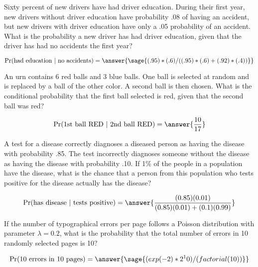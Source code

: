 \documentclass{ximera}
\begin{document}
\begin{problem}
Sixty percent of new drivers have had driver education. During their first year, new drivers without driver education have probability .08 of having an accident, but new drivers with driver education have only a .05 probability of an accident. What is the probability a new driver has had driver education, given that the driver has had no accidents the first year? 

\begin{prompt}
$$\Pr(\text{had education }|\text{ no accidents})=\answer{\sage{(.95)*(.6)/((.95)*(.6)+(.92)*(.4))}}$$
\end{prompt}
\end{problem}


\begin{problem}
An urn contains 6 red balls and 3 blue balls. One ball is selected at random and is replaced by a ball of the other color. A second ball is then chosen. What is the conditional probability that the first ball selected is red, given that the second ball was red? 

\begin{prompt}
$$\Pr(\text{1st ball RED }|\text{ 2nd ball RED})=\answer{\frac{10}{17}}$$

\end{prompt}
\end{problem}



\begin{problem}
 A test for a disease correctly diagnoses a diseased person as having the disease with probability .85. The test incorrectly diagnoses someone without the disease as having the disease with probability .10. If 1\% of the people in a population have the disease, what is the chance that a person from this population who tests positive for the disease actually has the disease? 

\begin{prompt}
$$\Pr(\text{has disease }|\text{ tests positive})=\answer{ \frac{(0.85)(0.01)}{(0.85)(0.01)+(0.1)(0.99)}}$$
\end{prompt}
\end{problem}


\begin{problem}

If the number of typographical errors per page follows a Poisson distribution with parameter $\lambda=0.2$, what is the probability that the total number of errors in 10 randomly selected pages is 10? 

\begin{prompt}
$$\Pr(\text{10 errors in 10 pages})= \answer{\sage{(exp(-2)*2^10)/(factorial(10))}}$$
\end{prompt}
\end{problem}
\end{document}
